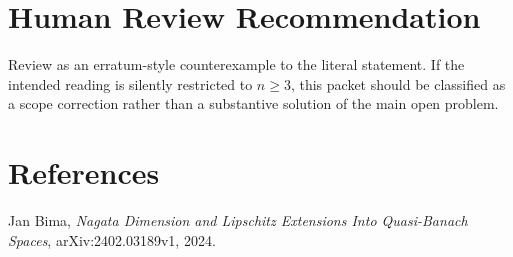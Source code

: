 \documentclass[11pt]{article}
\begin{document}
\section*{Human Review Recommendation}

Review as an erratum-style counterexample to the literal statement.  If the
intended reading is silently restricted to \(n\ge3\), this packet should be
classified as a scope correction rather than a substantive solution of the
main open problem.

\section*{References}

Jan Bima, \emph{Nagata Dimension and Lipschitz Extensions Into Quasi-Banach
Spaces}, arXiv:2402.03189v1, 2024.
\end{document}
